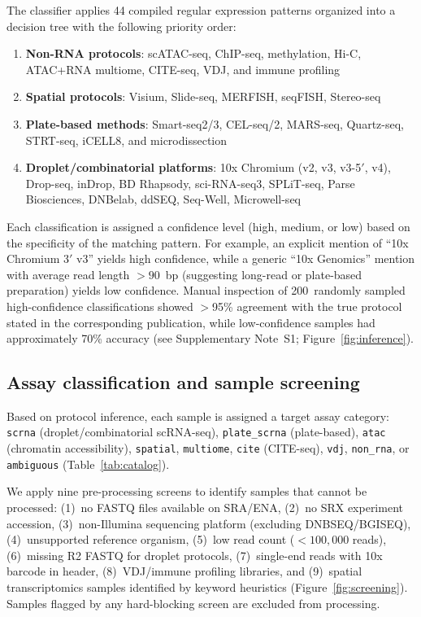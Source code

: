 \documentclass[10pt,twocolumn,letterpaper]{article}
\begin{document}
The classifier applies 44 compiled regular expression patterns organized into
a decision tree with the following priority order:
\begin{enumerate}[nosep,leftmargin=1.5em]
  \item \textbf{Non-RNA protocols}: scATAC-seq, ChIP-seq, methylation,
    Hi-C, ATAC+RNA multiome, CITE-seq, VDJ, and immune profiling
  \item \textbf{Spatial protocols}: Visium, Slide-seq, MERFISH, seqFISH,
    Stereo-seq
  \item \textbf{Plate-based methods}: Smart-seq2/3, CEL-seq/2, MARS-seq,
    Quartz-seq, STRT-seq, iCELL8, and microdissection
  \item \textbf{Droplet/combinatorial platforms}: 10x Chromium (v2, v3,
    v3-5$'$, v4), Drop-seq, inDrop, BD Rhapsody, sci-RNA-seq3, SPLiT-seq,
    Parse Biosciences, DNBelab, ddSEQ, Seq-Well, Microwell-seq
\end{enumerate}

Each classification is assigned a confidence level (high, medium, or low)
based on the specificity of the matching pattern. For example, an explicit
mention of ``10x Chromium 3$'$ v3'' yields high confidence, while a generic
``10x Genomics'' mention with average read length $>90$~bp (suggesting
long-read or plate-based preparation) yields low confidence.
Manual inspection of 200~randomly sampled high-confidence classifications
showed $>$95\% agreement with the true protocol stated in the
corresponding publication, while low-confidence samples had approximately
70\% accuracy (see Supplementary Note~S1; Figure~\ref{fig:inference}).

\subsection{Assay classification and sample screening}

Based on protocol inference, each sample is assigned a target assay category:
\texttt{scrna} (droplet/combinatorial scRNA-seq), \texttt{plate\_scrna}
(plate-based), \texttt{atac} (chromatin accessibility), \texttt{spatial},
\texttt{multiome}, \texttt{cite} (CITE-seq), \texttt{vdj}, \texttt{non\_rna},
or \texttt{ambiguous} (Table~\ref{tab:catalog}).

We apply nine pre-processing screens to identify samples that cannot be
processed: (1)~no FASTQ files available on SRA/ENA, (2)~no SRX experiment
accession, (3)~non-Illumina sequencing platform (excluding DNBSEQ/BGISEQ),
(4)~unsupported reference organism, (5)~low read count ($<100{,}000$ reads),
(6)~missing R2 FASTQ for droplet protocols, (7)~single-end reads with 10x
barcode in header, (8)~VDJ/immune profiling libraries, and (9)~spatial
transcriptomics samples identified by keyword heuristics
(Figure~\ref{fig:screening}). Samples flagged by any hard-blocking screen
are excluded from processing.
\end{document}
